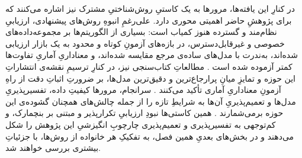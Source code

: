 در کنارِ این یافته‌ها، مرورها به یک کاستیِ روش‌شناختیِ مشترک نیز اشاره می‌کنند که
برای پژوهشِ حاضر اهمیتی محوری دارد. علی‌رغمِ انبوهِ روش‌های پیشنهادی، ارزیابیِ
نظام‌مند و گسترده هنوز کمیاب است: بسیاری از الگوریتم‌ها بر مجموعه‌داده‌های خصوصی و
غیرقابل‌دسترس، در بازه‌های آزمونِ کوتاه و محدود به یک بازار ارزیابی شده‌اند،
به‌ندرت با مدل‌های ساده‌ی مرجع مقایسه شده‌اند، و معناداریِ آماریِ تفاوت‌ها کمتر
آزموده شده است \cite{lago_forecasting_2021, chai_forecasting_2024}. مطالعاتِ
کتاب‌سنجی نیز، در کنارِ ترسیمِ نقشه‌ی انتشاراتِ این حوزه و تمایزِ میانِ
پرارجاع‌ترین و دقیق‌ترین مدل‌ها، بر ضرورتِ اثباتِ دقت از راهِ آزمونِ معناداریِ
آماری تأکید می‌کنند \cite{zema_models_2022}. سرانجام، مرورها کیفیتِ داده،
تفسیرپذیریِ مدل‌ها و تعمیم‌پذیریِ آن‌ها به شرایطِ تازه را از جمله چالش‌های همچنان
گشوده‌ی این حوزه برمی‌شمارند \cite{oconnor_review_2025}. همین کاستی‌ها 
نبودِ ارزیابیِ تکرارپذیر و مبتنی بر بنچمارک، و کم‌توجهی به تفسیرپذیری و
تعمیم‌پذیری  چارچوبِ انگیزشیِ این پژوهش را شکل می‌دهند و در بخش‌های بعدیِ
همین فصل، به تفکیکِ هر خانواده از روش‌ها، با جزئیاتِ بیشتری بررسی خواهند شد.
